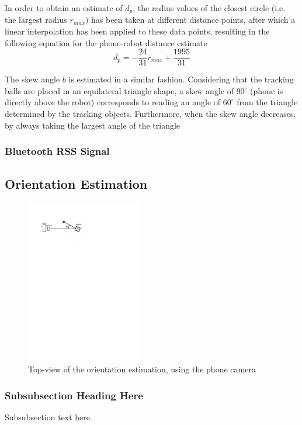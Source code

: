 \documentclass[journal]{IEEEtran}
\let\MYoriglatexcaption\caption
\renewcommand{\caption}[2][\relax]{\MYoriglatexcaption[#2]{#2}}
\begin{document}
In order to obtain an estimate of $d_p$, the radius values of the closest circle (i.e. the largest radius $r_{max})$ has been taken at different distance points, after which a linear interpolation has been applied to these data points, resulting in the following equation for the phone-robot distance estimate
\begin{equation}
d_p=-\frac{24}{31}r_{max}+\frac{1995}{31}
\end{equation}

The skew angle $b$ is estimated in a similar fashion. Considering that the tracking balls are placed in an equilateral triangle shape, a skew angle of $90^{\circ}$ (phone is directly above the robot) corresponds to reading an angle of $60^{\circ}$ from the triangle determined by the tracking objects. Furthermore, when the skew angle decreases, by always taking the largest angle of the triangle

\subsubsection{Bluetooth RSS Signal}

\subsection{Orientation Estimation}
\begin{figure}[!htpb]
\centering
\includegraphics[width=2in]{images/orientation_meas}
\caption{Top-view of the orientation estimation, using the phone camera}
\label{fig:orient_camera}
\end{figure}

\subsubsection{Subsubsection Heading Here}
Subsubsection text here.
\end{document}
